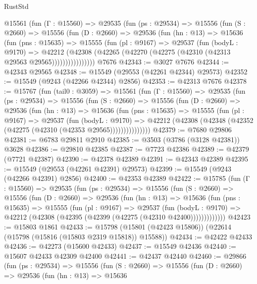\begin{lexlean}{RustStd}
\begin{coremodule}
      @15561
        (fun (Γ : @15560) =>
        @29535
          (fun (ps : @29534) =>
          @15556
            (fun (S : @2660) =>
            @15556
              (fun (D : @2660) =>
              @29536
                (fun (hn : @13) =>
                @15636
                  (fun (pns : @15635) =>
                  @15555
                    (fun (pl : @9167) =>
                    @29537
                      (fun (bodyL : @9170) =>
                      @42212
                        (@42308
                          (@42265 (@42270 (@42275 (@42310 (@42313 @29563 @29565))))))))))))))))
    @7676
@42343 := @3027 @7676
@42344 := @42343 @29565
@42348 := @15549 (@29553 (@42261 @42344) @29573)
@42352 := @15549 (@9243 (@42266 @42344) @2856)
@42353 := @42313 @7676
@42378 := @15767
    (fun (tail0 : @3059) =>
    @15561
      (fun (Γ : @15560) =>
      @29535
        (fun (ps : @29534) =>
        @15556
          (fun (S : @2660) =>
          @15556
            (fun (D : @2660) =>
            @29536
              (fun (hn : @13) =>
              @15636
                (fun (pns : @15635) =>
                @15555
                  (fun (pl : @9167) =>
                  @29537
                    (fun (bodyL : @9170) =>
                    @42212 (@42308 (@42348 (@42352 (@42275 (@42310 (@42353 @29565)))))))))))))))
@42379 := @7680 @29806
@42381 := @6783 @29811 @2910
@42385 := @3503 (@3786 (@3128 @42381)) @3628
@42386 := @29810 @42385
@42387 := @7723 @42386
@42389 := @42379 (@7721 @42387)
@42390 := @42378 @42389
@42391 := @42343 @42389
@42395 := @15549 (@29553 (@42261 @42391) @29573)
@42399 := @15549 (@9243 (@42266 @42391) @2856)
@42400 := @42353 @42389
@42422 := @15785
    (fun (Γ : @15560) =>
    @29535
      (fun (ps : @29534) =>
      @15556
        (fun (S : @2660) =>
        @15556
          (fun (D : @2660) =>
          @29536
            (fun (hn : @13) =>
            @15636
              (fun (pns : @15635) =>
              @15555
                (fun (pl : @9167) =>
                @29537
                  (fun (bodyL : @9170) =>
                  @42212 (@42308 (@42395 (@42399 (@42275 (@42310 @42400)))))))))))))
@42423 := @15803 @1861
@42433 := @15798 (@15801 (@42423 @15806)) (@22614 (@15798 (@15816 (@15803 @2319 @15818)) @15588))
@42434 := @42422 @42433
@42436 := @42273 (@15600 @42433)
@42437 := @15549 @42436
@42440 := @15607 @42433 @42309 @42400
@42441 := @42437 @42440
@42460 := @29866
    (fun (ps : @29534) =>
    @15556
      (fun (S : @2660) =>
      @15556
        (fun (D : @2660) =>
        @29536
          (fun (hn : @13) =>
          @15636

\end{coremodule}
\end{lexlean}

